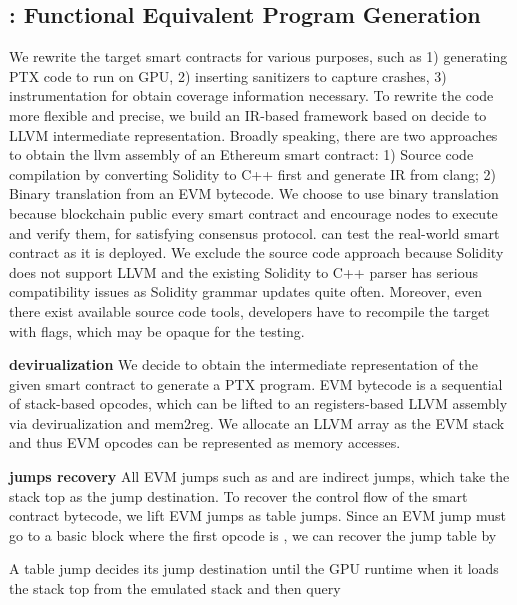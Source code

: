     
\subsection{{\translator}: Functional Equivalent Program Generation}
\label{design:translator}
We rewrite the target smart contracts for various purposes, such as 1) generating PTX code to run on GPU, 2) inserting sanitizers to capture crashes, 3) instrumentation for obtain coverage information necessary. 
%
To rewrite the code more flexible and precise, we build an IR-based framework based on decide to LLVM intermediate representation.
%
Broadly speaking, there are two approaches to obtain the llvm assembly of an Ethereum smart contract: 1) Source code compilation by converting Solidity to C++ first and generate IR from clang\cite{}; 2) Binary translation from an EVM bytecode. 
We choose to use binary translation because blockchain public every smart contract and encourage nodes to execute and verify them, for satisfying consensus protocol. {\tool} can test the real-world smart contract as it is deployed. 
We exclude the source code approach because Solidity does not support LLVM and the existing Solidity to C++ parser has serious compatibility issues as Solidity grammar updates quite often. Moreover, even there exist available source code tools, developers have to recompile the target with flags, which may be opaque for the testing. 


\noindent \textbf{devirualization}
We decide to obtain the intermediate representation of the given smart contract to generate a PTX program. 
%
EVM bytecode is a sequential of stack-based opcodes, which can be lifted to an registers-based LLVM assembly via devirualization and mem2reg\cite{}. 
We allocate an LLVM array as the EVM stack and thus EVM opcodes can be represented as memory accesses. 

\noindent \textbf{jumps recovery}
All EVM jumps such as  and  are indirect jumps, which take the stack top as the jump destination. 
To recover the control flow of the smart contract bytecode, we lift EVM jumps as table jumps. 
Since an EVM jump must go to a basic block where the first opcode is , we can recover the jump table by 

A table jump decides its jump destination until the GPU runtime when it loads the stack top from the emulated stack and then query



